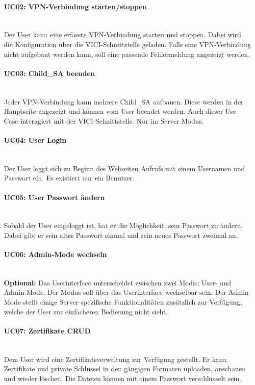 \paragraph{UC02: VPN-Verbindung starten/stoppen}\mbox{} \\
Der User kann eine erfasste VPN-Verbindung starten und stoppen. Dabei wird die Konfiguration über die VICI-Schnittstelle geladen. Falls eine VPN-Verbindung nicht aufgebaut werden kann, soll eine passende Fehlermeldung angezeigt werden. 

\paragraph{UC03: Child\_SA beenden}\mbox{} \\
Jeder VPN-Verbindung kann mehrere Child\_SA aufbauen. Diese werden in der Hauptseite angezeigt und können vom User beendet werden. Auch dieser Use Case interagiert mit der VICI-Schnittstelle. Nur im Server Modus.

\paragraph{UC04: User Login}\mbox{} \\
Der User loggt sich zu Beginn des Webseiten Aufrufs mit einem Usernamen und Passwort ein. Es existiert nur ein Benutzer.

\paragraph{UC05: User Passwort ändern}\mbox{} \\
Sobald der User eingeloggt ist, hat er die Möglichkeit, sein Passwort zu ändern. Dabei gibt er sein altes Passwort einmal und sein neues Passwort zweimal an.

\paragraph{UC06: Admin-Mode wechseln}\mbox{} \\
\textbf{Optional:} Das Userinterface unterscheidet zwischen zwei Modis: User- und Admin-Mode. Der Modus soll über das Userinterface wechselbar sein. Der Admin-Mode stellt einige Server-spezifische Funktionalitäten zusätzlich zur Verfügung, welche der User zur einfacheren Bedienung nicht sieht.

\paragraph{UC07: Zertifikate CRUD}\mbox{} \\
Dem User wird eine Zertifikatsverwaltung zur Verfügung gestellt. Er kann Zertifikate und private Schlüssel in den gängigen Formaten uploaden, anschauen und wieder löschen. Die Dateien können mit einem Passwort verschlüsselt sein. 

